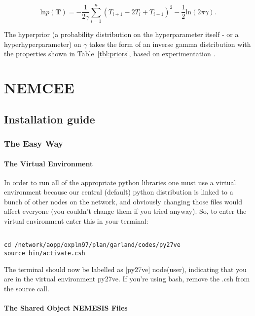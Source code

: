 \documentclass[11pt, a4paper,titlepage]{report}
\begin{document}
\begin{equation} \label{eqn:tempsmooth}
\mathrm{ln} p(\bm{T}) = - \frac{1}{2 \gamma} \displaystyle\sum_{i=1}^{n} (T_{i+1} - 2T_i + T_{i-1})^2 - \frac{1}{2} \mathrm{ln}(2 \pi \gamma).
\end{equation}

The hyperprior (a probability distribution on the hyperparameter itself - or a hyperhyperparameter) on $\gamma$ takes the form of an inverse gamma distribution with the properties shown in Table~\ref{tbl:priors}, based on experimentation \citep{lang04, jullion07}.

\chapter{NEMCEE}

\section{Installation guide}

\subsection{The Easy Way}

\subsubsection{The Virtual Environment}

In order to run all of the appropriate python libraries one must use a virtual environment because our central (default) python distribution is linked to a bunch of other nodes on the network, and obviously changing those files would affect everyone (you couldn't change them if you tried anyway). So, to enter the virtual environment enter this in your terminal:

\lstset{language=csh} 
\begin{lstlisting}

cd /network/aopp/oxpln97/plan/garland/codes/py27ve
source bin/activate.csh
\end{lstlisting}

The terminal should now be labelled as [py27ve] node(user), indicating that you are in the virtual environment py27ve. If you're using bash, remove the .csh from the source call. 


\subsubsection{The Shared Object NEMESIS Files}
\end{document}
